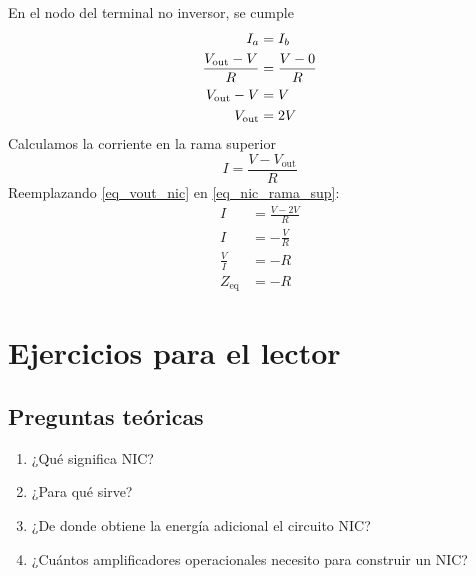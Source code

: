 En el nodo del terminal no inversor, se cumple
\begin{align}
  I_a&=I_b\notag\\ 
  \frac{V_\text{out}-V}{R}&=\frac{V-0}{R} \notag\\ 
  V_\text{out}-V &= V \notag \\ 
  V_\text{out} &= 2V \label{eq_vout_nic}
\end{align}
Calculamos la corriente en la rama superior
\begin{equation}\label{eq_nic_rama_sup}
  I=\frac{V-V_\text{out}}{R}
\end{equation}
Reemplazando \eqref{eq_vout_nic} en \eqref{eq_nic_rama_sup}:
\begin{align*}
  I&=\frac{V-2V}{R} \\ 
  I&=-\frac{V}{R} \\ 
  \frac{V}{I}&=-R \\ 
  Z_\text{eq}&= -R
\end{align*}

\section{Ejercicios para el lector}

\subsection{Preguntas teóricas}

\begin{enumerate}
  \item ¿Qué significa NIC?
  \item ¿Para qué sirve?
  \item ¿De donde obtiene la energía adicional el circuito NIC?
  \item ¿Cuántos amplificadores operacionales necesito para construir un NIC?
\end{enumerate}
